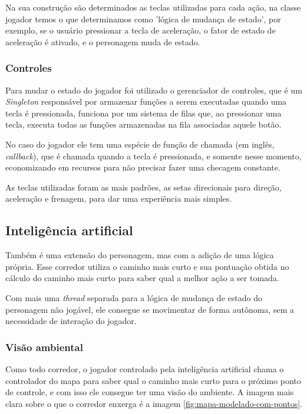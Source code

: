 Na sua construção são determinados as teclas utilizadas para cada ação, na classe jogador temos o que determinamos como 'lógica de mudança de estado', por exemplo, se o usuário pressionar a tecla de aceleração, o fator de estado de aceleração é ativado, e o personagem muda de estado.

\subsubsection{Controles}

Para mudar o estado do jogador foi utilizado o gerenciador de controles, que é um \textit{Singleton} responsável por armazenar funções a serem executadas quando uma tecla é pressionada, funciona por um sistema de filas que, ao pressionar uma tecla, executa todas as funções armazenadas na fila associadas aquele botão.

No caso do jogador ele tem uma espécie de função de chamada (em inglês, \textit{callback}), que é chamada quando a tecla é pressionada, e somente nesse momento, economizando em recursos para não precisar fazer uma checagem constante.

As teclas utilizadas foram as mais padrões, as setas direcionais para direção, aceleração e frenagem, para dar uma experiência mais simples.

\subsection{Inteligência artificial}

Também é uma extensão do personagem, mas com a adição de uma lógica própria. Esse corredor utiliza o caminho mais curto e sua pontuação obtida no cálculo do caminho mais curto para saber qual a melhor ação a ser tomada.

Com mais uma \textit{thread} separada para a lógica de mudança de estado do personagem não jogável, ele consegue se movimentar de forma autônoma, sem a necessidade de interação do jogador.

\subsubsection{Visão ambiental}

Como todo corredor, o jogador controlado pela inteligência artificial chama o controlador do mapa para saber qual o caminho mais curto para o próximo ponto de controle, e com isso ele consegue ter uma visão do ambiente. A imagem mais clara sobre o que o corredor enxerga é a imagem \ref{fig:mapa-modelado-com-pontos}.

